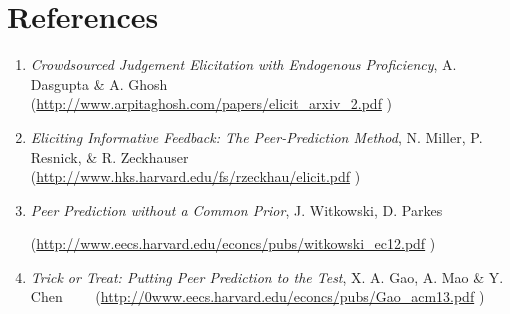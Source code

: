 \documentclass{scrartcl}
\begin{document}
\section{References}
\begin{enumerate}
	\item \emph{Crowdsourced Judgement Elicitation with Endogenous Proficiency}, A. Dasgupta \& A. Ghosh (\url{http://www.arpitaghosh.com/papers/elicit_arxiv_2.pdf} \label{itm:1})
	\item \emph{Eliciting Informative Feedback: The Peer-Prediction Method}, N. Miller, P. Resnick, \& R. Zeckhauser (\url{http://www.hks.harvard.edu/fs/rzeckhau/elicit.pdf} \label{itm:2})
	\item \emph{Peer Prediction without a Common Prior}, J. Witkowski, D. Parkes $\quad$
	
	(\url{http://www.eecs.harvard.edu/econcs/pubs/witkowski_ec12.pdf} \label{itm:3})
	\item \emph{Trick or Treat: Putting Peer Prediction to the Test}, X. A. Gao, A. Mao \& Y. Chen$\quad\quad$ (\url{http://0www.eecs.harvard.edu/econcs/pubs/Gao_acm13.pdf} \label{itm:4})
	
\end{enumerate}
\end{document}
